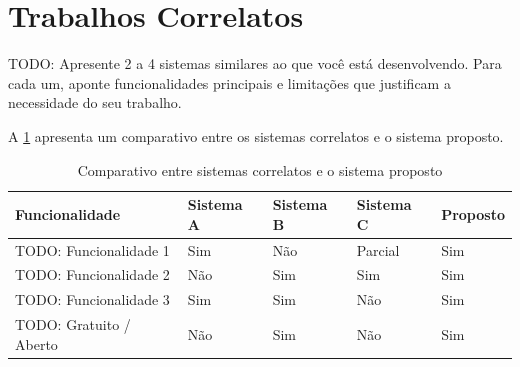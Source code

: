 \section{Trabalhos Correlatos}
\label{sec:correlatos}

TODO: Apresente 2 a 4 sistemas similares ao que você está desenvolvendo.
Para cada um, aponte funcionalidades principais e limitações que justificam
a necessidade do seu trabalho.

A \cref{tab:correlatos} apresenta um comparativo entre os sistemas
correlatos e o sistema proposto.

\begin{table}[H]
  \caption{Comparativo entre sistemas correlatos e o sistema proposto}
  \label{tab:correlatos}
  \centering
  \begin{tabularx}{\textwidth}{lXXXX}
    \toprule
    \textbf{Funcionalidade}  & \textbf{Sistema A} & \textbf{Sistema B}
                             & \textbf{Sistema C} & \textbf{Proposto} \\
    \midrule
    TODO: Funcionalidade 1   & Sim    & Não    & Parcial & Sim  \\
    TODO: Funcionalidade 2   & Não    & Sim    & Sim     & Sim  \\
    TODO: Funcionalidade 3   & Sim    & Sim    & Não     & Sim  \\
    TODO: Gratuito / Aberto  & Não    & Sim    & Não     & Sim  \\
    \bottomrule
  \end{tabularx}
\end{table}

